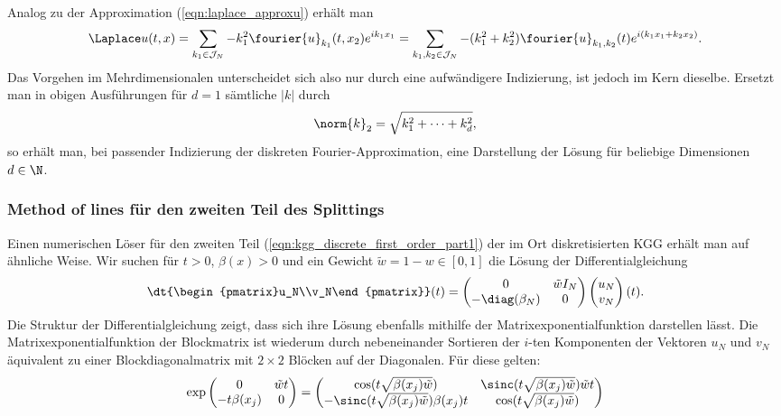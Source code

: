 Analog zu der Approximation (\ref{eqn:laplace_approxu}) erhält man
\[\Laplace u(t,x)=\sum_{k_1\in\mathcal{J}_N}-k_1^2\fourier{u}_{k_1}(t,x_2) e^{ik_1x_1}=\sum_{k_1,k_2\in\mathcal{J}_N}-(k_1^2+k_2^2)\fourier{u}_{k_1,k_2}(t)e^{i(k_1x_1+k_2x_2)}.\]
Das Vorgehen im Mehrdimensionalen unterscheidet sich also nur durch eine aufwändigere Indizierung, ist jedoch im Kern dieselbe. Ersetzt man in obigen Ausführungen für $d=1$ sämtliche $|k|$ durch \[\norm{k}_2=\sqrt{k_1^2+\dots+k_d^2},\]so erhält man, bei passender Indizierung der diskreten Fourier-Approximation, eine Darstellung der Lösung für beliebige Dimensionen $d\in\N$.
\subsubsection*{Method of lines für den zweiten Teil des Splittings}
Einen numerischen Löser für den zweiten Teil (\ref{eqn:kgg_discrete_first_order_part1}) der im Ort diskretisierten KGG erhält man auf ähnliche Weise. Wir suchen für $t>0$, $\beta(x)>0$ und ein Gewicht $\tilde{w}=1-w\in [0,1]$ die Lösung der Differentialgleichung
\begin{equation*}
\dt{\begin{pmatrix}u_N\\v_N\end{pmatrix}}(t)=
\begin{pmatrix}0 & \tilde{w}I_N\\ -\diag({\beta_N}) & 0\end{pmatrix}
\begin{pmatrix}u_N\\v_N\end{pmatrix}(t).
\end{equation*}
Die Struktur der Differentialgleichung zeigt, dass sich ihre Lösung ebenfalls mithilfe der Matrixexponentialfunktion darstellen lässt. Die Matrixexponentialfunktion der Blockmatrix ist wiederum durch nebeneinander Sortieren der $i$-ten Komponenten der Vektoren $u_N$ und $v_N$ äquivalent zu einer Blockdiagonalmatrix mit $2\times 2$ Blöcken auf der Diagonalen. Für diese gelten:
\[\exp\begin{pmatrix}0 & \tilde{w}t\\ -t\beta(x_j) & 0\end{pmatrix}=
\begin{pmatrix}\cos(t\sqrt{\beta(x_j)\tilde{w}}) & \sinc(t\sqrt{\beta(x_j)\tilde{w}})\tilde{w}t\\
-\sinc(t\sqrt{\beta(x_j)\tilde{w}})\beta(x_j)t & \cos(t\sqrt{\beta(x_j)\tilde{w}})\end{pmatrix}\]
